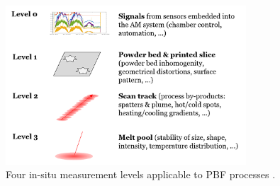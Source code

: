 \begin{figure}
    \centering
    \includegraphics[width=0.8\textwidth]{Images/Level Measurement.png}
    \caption[In-situ measurement levels.]{Four in-situ measurement levels applicable to PBF processes \cite{colosimo_-machine_2020}.}
    \label{fig:levels}
\end{figure}

